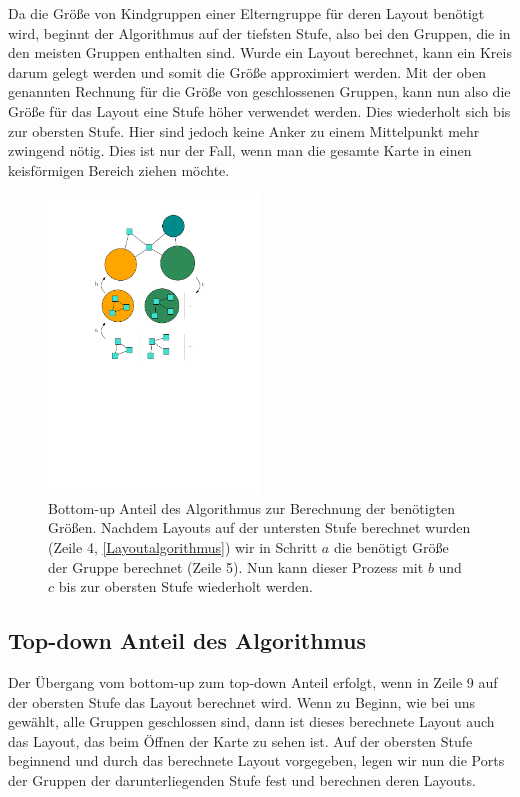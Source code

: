 Da die Größe von Kindgruppen einer Elterngruppe für deren Layout benötigt wird, beginnt der Algorithmus auf der tiefsten Stufe,
also bei den Gruppen, die in den meisten Gruppen enthalten sind. Wurde ein Layout berechnet, kann ein Kreis darum gelegt werden und somit die Größe approximiert werden.
Mit der oben genannten Rechnung für die Größe von geschlossenen Gruppen, kann nun also die Größe für das Layout eine Stufe höher verwendet werden.
Dies wiederholt sich bis zur obersten Stufe. Hier sind jedoch keine Anker zu einem Mittelpunkt mehr zwingend nötig.
Dies ist nur der Fall, wenn man die gesamte Karte  in einen keisförmigen Bereich ziehen möchte.

\begin{figure}[h!]
\begin{center} 
  \includegraphics[width=0.5\textwidth]{Pics/BottomUp2.pdf}
  \caption{Bottom-up Anteil des Algorithmus zur Berechnung der benötigten Größen.
  Nachdem Layouts auf der untersten Stufe berechnet wurden (Zeile 4, \autoref{Layoutalgorithmus}) wir in Schritt $a$ die benötigt Größe der Gruppe berechnet (Zeile 5). 
  Nun kann dieser Prozess mit $b$ und $c$ bis zur obersten Stufe wiederholt werden. }
  \label{f:BottomUp}
\end{center}
\end{figure}


\subsection{Top-down Anteil des Algorithmus}
Der Übergang vom bottom-up zum top-down Anteil erfolgt, wenn in Zeile 9 auf der obersten Stufe das Layout berechnet wird.
Wenn zu Beginn, wie bei uns gewählt, alle Gruppen geschlossen sind, dann ist dieses berechnete Layout auch das Layout, das beim Öffnen der Karte zu sehen ist.
Auf der obersten Stufe beginnend und durch das berechnete Layout vorgegeben, legen wir nun die Ports der Gruppen der darunterliegenden Stufe fest und berechnen deren Layouts.

